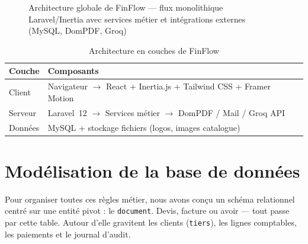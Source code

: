 \documentclass[12pt,a4paper]{report}
\begin{document}
\begin{figure}[H]
{%
}
\caption{Architecture globale de FinFlow --- flux monolithique Laravel/Inertia avec services métier et intégrations externes (MySQL, DomPDF, Groq)}
\label{fig:architecture-globale}
\end{figure}

\begin{table}[H]
\centering
\caption{Architecture en couches de FinFlow}
\begin{tabular}{@{}ll@{}}
\toprule
\textbf{Couche} & \textbf{Composants} \\
\midrule
Client & Navigateur $\rightarrow$ React + Inertia.js + Tailwind CSS + Framer Motion \\
Serveur & Laravel~12 $\rightarrow$ Services métier $\rightarrow$ DomPDF / Mail / Groq API \\
Données & MySQL + stockage fichiers (logos, images catalogue) \\
\bottomrule
\end{tabular}
\end{table}

\section{Modélisation de la base de données}

Pour organiser toutes ces règles métier, nous avons conçu un schéma relationnel centré sur une entité pivot : le \texttt{document}. Devis, facture ou avoir --- tout passe par cette table. Autour d'elle gravitent les clients (\texttt{tiers}), les lignes comptables, les paiements et le journal d'audit.
\end{document}
